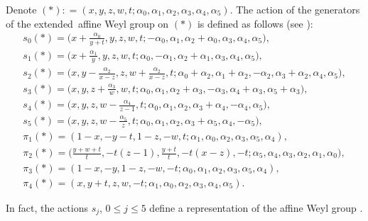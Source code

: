 \documentclass[pdftex]{sigma}
\numberwithin{equation}{section}
\begin{document}
 Denote $(*): =(x, y, z, w, t ; \alpha_0, \alpha_1, \alpha_2, \alpha_3, \alpha_4, \alpha_5)$.
 The action of the generators of the exten\-ded~affine Weyl group  on $(*)$ is defined as follows (see \cite{Sa}):
 \begin{gather}
 s_0(*) =
 \biggl(x + \frac{\alpha_0}{y+t}, y, z, w, t ; -\alpha_0, \alpha_1, \alpha_2+\alpha_0, \alpha_3, \alpha_4, \alpha_5\biggr),\nonumber\\
 s_1(*) =
 \biggl(x + \frac{\alpha_1}{y}, y, z, w, t ; \alpha_0, -\alpha_1, \alpha_2+\alpha_1, \alpha_3, \alpha_4, \alpha_5\biggr),\nonumber\\
 s_2(*) =
 \biggl(x, y - \frac{\alpha_2}{x-z}, z, w + \frac{\alpha_2}{x-z}, t ; \alpha_0+\alpha_2, \alpha_1+\alpha_2, -\alpha_2,
 \alpha_3+\alpha_2, \alpha_4, \alpha_5\biggr),\nonumber\\
 s_3(*) =
 \biggl(x, y, z + \frac{\alpha_3}{w}, w, t ; \alpha_0, \alpha_1, \alpha_2+\alpha_3, -\alpha_3, \alpha_4+\alpha_3, \alpha_5+\alpha_3\biggr),
 \nonumber
 \\
 s_4 (*) =
 \biggl(x, y, z, w - \frac{\alpha_4}{z-1}, t ; \alpha_0, \alpha_1, \alpha_2, \alpha_3+\alpha_4, -\alpha_4, \alpha_5\biggr),
 \nonumber\\
 s_5 (*) =
 \biggl(x, y, z, w -\frac{\alpha_5}{z}, t ; \alpha_0, \alpha_1, \alpha_2, \alpha_3+\alpha_5, \alpha_4, -\alpha_5\biggr),\nonumber\\
 \pi_1(*) =
 (1-x, -y-t, 1-z, -w, t ; \alpha_1, \alpha_0, \alpha_2, \alpha_3, \alpha_5, \alpha_4),\nonumber\\
 \pi_2(*) =
 \biggl(\frac{y+w+t}{t}, -t (z-1), \frac{y+t}{t}, -t (x-z), -t ; \alpha_5, \alpha_4, \alpha_3, \alpha_2, \alpha_1, \alpha_0\biggr),
 \nonumber\\
 \pi_3(*) =
 (1-x, -y, 1-z, -w, -t ; \alpha_0, \alpha_1, \alpha_2, \alpha_3, \alpha_5, \alpha_4),\nonumber\\
 \pi_4(*) =
 (x, y+t, z, w, -t ; \alpha_1, \alpha_0, \alpha_2, \alpha_3, \alpha_4, \alpha_5) .\label{g}
 \end{gather}

 In fact, the actions $s_j$, $0 \leq j \leq 5$ define a representation of the affine Weyl group .
\end{document}
